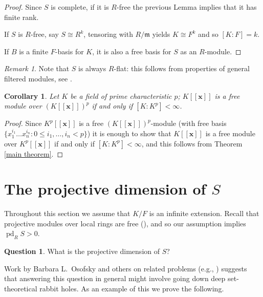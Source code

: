 \documentclass[12pt]{amsart}
\theoremstyle{plain}%
\newtheorem{cor}[thm]{Corollary}
\theoremstyle{definition}
\newtheorem{qu}[thm]{Question}
\theoremstyle{remark}
\newtheorem{rmk}[thm]{Remark}
\DeclareMathOperator{\pd}{pd}
\def\fm{{\mathfrak{m}}}
\begin{document}
\begin{proof}
Since $S$ is complete, if it is $R$-free the previous Lemma implies that it has finite rank.

If $S$ is $R$-free, say $S\cong R^k$, tensoring with $R/\fm$ yields $K\cong F^k$ and so $[K:F]=k$.

If $B$ is a finite $F$-basis for $K$, it is also a free basis for $S$ as an $R$-module.
\end{proof}

\begin{rmk}
Note that $S$ is always $R$-flat: this follows from properties of general filtered modules, see
\cite[Chapter III, \S 5]{Bourbaki}.
\end{rmk}





\begin{cor}\label{Corollary 1.4}
Let $K$ be a field of prime characteristic $p$;
$K[\![\mathbf{x}]\!]$ is a free module over $(K[\![\mathbf{x}]\!])^p$
if and only if $[K : K^p]< \infty$.
\end{cor}


\begin{proof}
Since  $K^p[\![\mathbf{x}]\!]$ is a free $(K[\![\mathbf{x}]\!])^p$-module
(with free basis $\{ x_1^{i_1} \dots x_n^{i_n} : 0\leq i_1, \dots, i_n <p\}$)
it is enough to show that $K[\![\mathbf{x}]\!]$ is a free module over $K^p[\![\mathbf{x}]\!]$
if and only if $[K : K^p]< \infty$, and this follows from  Theorem \ref{main theorem}.
\end{proof}


\section{The projective dimension of $S$}

Throughout this section we assume that $K/F$ is an infinite
extension.
Recall that projective modules over local rings are free
(\cite[Theorem 2.5]{Matsumura}), and so our assumption implies $\pd_R S>0$.

\begin{qu}
What is the projective dimension of $S$?
\end{qu}

Work by Barbara L.~Osofsky and others
on related problems (e.g., \cite{Osofsky})
suggests that answering  this question in general might
involve
going down deep set-theoretical rabbit holes.
As an example of this we prove the following.
\end{document}
